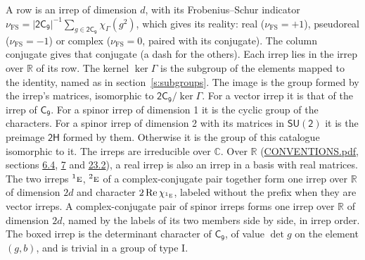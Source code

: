 \documentclass[10pt,a4paper]{article}
\numberwithin{equation}{section}
\newcommand{\grp}[1]{\mathsf{#1}}
\newcommand{\irr}[1]{\text{\normalfont\scshape #1}}
\newcommand{\conjpair}[1]{{}^{#1}}
\newcommand{\irchar}[1]{\chi_{#1}}
\newcommand{\fsind}{\nu_{\mathrm{FS}}}
\begin{document}
\leavevmode\label{n:index.frobenius}\label{n:head.irrep}\label{n:head.reality}A row is an irrep of dimension $d$, with its Frobenius--Schur indicator $\fsind = |\grp{2C_{9}}|^{-1}\allowbreak\sum_{g\in\grp{2C_{9}}}\irchar{\Gamma}(g^2)$, which gives its reality: real ($\fsind = +1$), pseudoreal ($\fsind = -1$) or complex ($\fsind = 0$, paired with its conjugate). \label{n:head.conjugate}The column conjugate gives that conjugate (a dash for the others). \label{n:head.over.real}Each irrep lies in the irrep over $\mathbb{R}$ of its row. \label{n:head.kernel}The kernel $\ker\Gamma$ is the subgroup of the elements mapped to the identity, named as in section~\ref{s:subgroups}. \label{n:head.image}The image is the group formed by the irrep's matrices, isomorphic to $\grp{2C_{9}}/\ker\Gamma$. For a vector irrep it is that of the irrep of \href{../../../rotation/data/pdf/C9.pdf}{$\grp{C_{9}}$}. For a spinor irrep of dimension 1 it is the cyclic group of the characters. For a spinor irrep of dimension 2 with its matrices in $\grp{SU(2)}$ it is the preimage $\grp{2H}$ formed by them. Otherwise it is the group of this catalogue isomorphic to it. The irreps are irreducible over $\mathbb{C}$. Over $\mathbb{R}$ (\href{../../CONVENTIONS.pdf}{CONVENTIONS.pdf}, sections \href{../../../rotation/CONVENTIONS.pdf\#conv.6.4}{6.4}, \href{../../../rotation/CONVENTIONS.pdf\#conv.7}{7} and \href{../../CONVENTIONS.pdf\#conv.23.2}{23.2}), a real irrep is also an irrep in a basis with real matrices. The two irreps $\conjpair{1}\irr{e}$, $\conjpair{2}\irr{e}$ of a complex-conjugate pair together form one irrep over $\mathbb{R}$ of dimension $2d$ and character $2\operatorname{Re}\irchar{\conjpair{1}\irr{e}}$, labeled without the prefix when they are vector irreps. A complex-conjugate pair of spinor irreps forms one irrep over $\mathbb{R}$ of dimension $2d$, named by the labels of its two members side by side, in irrep order. \label{n:mark.determinant}The boxed irrep is the determinant character of \href{../../../rotation/data/pdf/C9.pdf}{$\grp{C_{9}}$}, of value $\det g$ on the element $(g, b)$, and is trivial in a group of type I.
\setlength{\emergencystretch}{2em}\par\setlength{\emergencystretch}{0pt}
\end{document}
